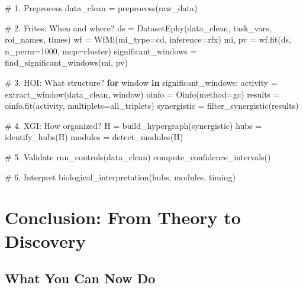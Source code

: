 \documentclass[
  11pt,
  letterpaper,
  oneside,
  openany]{book}
\newenvironment{Shaded}{\begin{snugshade}}{\end{snugshade}}
\newcommand{\CommentTok}[1]{\textcolor[rgb]{0.37,0.37,0.37}{#1}}
\newcommand{\ControlFlowTok}[1]{\textcolor[rgb]{0.00,0.23,0.31}{\textbf{#1}}}
\newcommand{\DecValTok}[1]{\textcolor[rgb]{0.68,0.00,0.00}{#1}}
\newcommand{\KeywordTok}[1]{\textcolor[rgb]{0.00,0.23,0.31}{\textbf{#1}}}
\newcommand{\NormalTok}[1]{\textcolor[rgb]{0.00,0.23,0.31}{#1}}
\newcommand{\OperatorTok}[1]{\textcolor[rgb]{0.37,0.37,0.37}{#1}}
\newcommand{\StringTok}[1]{\textcolor[rgb]{0.13,0.47,0.30}{#1}}
\begin{document}
\begin{Shaded}
\begin{Highlighting}[]
\CommentTok{\# 1. Preprocess}
\NormalTok{data\_clean }\OperatorTok{=}\NormalTok{ preprocess(raw\_data)}

\CommentTok{\# 2. Frites: When and where?}
\NormalTok{ds }\OperatorTok{=}\NormalTok{ DatasetEphy(data\_clean, task\_vars, roi\_names, times)}
\NormalTok{wf }\OperatorTok{=}\NormalTok{ WfMi(mi\_type}\OperatorTok{=}\StringTok{\textquotesingle{}cd\textquotesingle{}}\NormalTok{, inference}\OperatorTok{=}\StringTok{\textquotesingle{}rfx\textquotesingle{}}\NormalTok{)}
\NormalTok{mi, pv }\OperatorTok{=}\NormalTok{ wf.fit(ds, n\_perm}\OperatorTok{=}\DecValTok{1000}\NormalTok{, mcp}\OperatorTok{=}\StringTok{\textquotesingle{}cluster\textquotesingle{}}\NormalTok{)}
\NormalTok{significant\_windows }\OperatorTok{=}\NormalTok{ find\_significant\_windows(mi, pv)}

\CommentTok{\# 3. HOI: What structure?}
\ControlFlowTok{for}\NormalTok{ window }\KeywordTok{in}\NormalTok{ significant\_windows:}
\NormalTok{    activity }\OperatorTok{=}\NormalTok{ extract\_window(data\_clean, window)}
\NormalTok{    oinfo }\OperatorTok{=}\NormalTok{ Oinfo(method}\OperatorTok{=}\StringTok{\textquotesingle{}gc\textquotesingle{}}\NormalTok{)}
\NormalTok{    results }\OperatorTok{=}\NormalTok{ oinfo.fit(activity, multiplets}\OperatorTok{=}\NormalTok{all\_triplets)}
\NormalTok{    synergistic }\OperatorTok{=}\NormalTok{ filter\_synergistic(results)}

\CommentTok{\# 4. XGI: How organized?}
\NormalTok{H }\OperatorTok{=}\NormalTok{ build\_hypergraph(synergistic)}
\NormalTok{hubs }\OperatorTok{=}\NormalTok{ identify\_hubs(H)}
\NormalTok{modules }\OperatorTok{=}\NormalTok{ detect\_modules(H)}

\CommentTok{\# 5. Validate}
\NormalTok{run\_controls(data\_clean)}
\NormalTok{compute\_confidence\_intervals()}

\CommentTok{\# 6. Interpret}
\NormalTok{biological\_interpretation(hubs, modules, timing)}
\end{Highlighting}
\end{Shaded}

\section{Conclusion: From Theory to
Discovery}\label{conclusion-from-theory-to-discovery}

\subsection{What You Can Now Do}\label{what-you-can-now-do}
\end{document}
